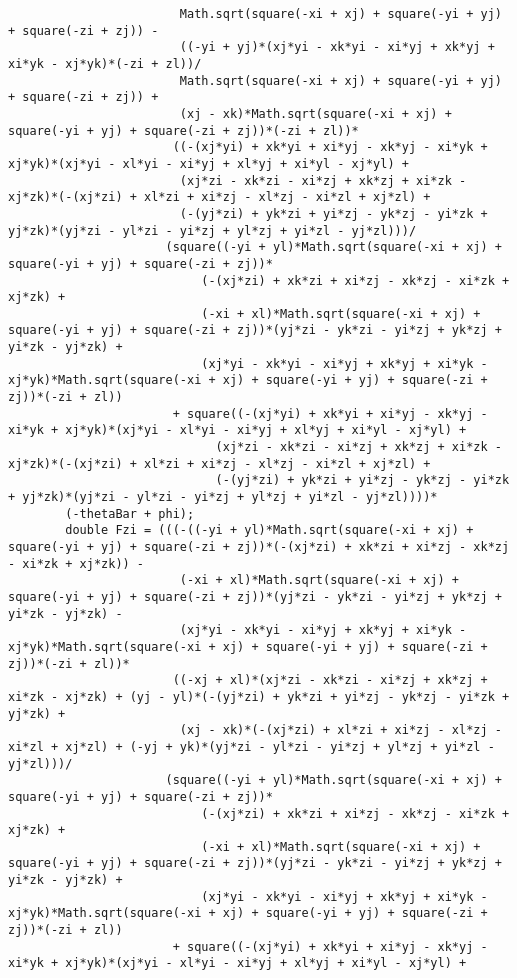 \begin{lstlisting}
						Math.sqrt(square(-xi + xj) + square(-yi + yj) + square(-zi + zj)) - 
						((-yi + yj)*(xj*yi - xk*yi - xi*yj + xk*yj + xi*yk - xj*yk)*(-zi + zl))/
						Math.sqrt(square(-xi + xj) + square(-yi + yj) + square(-zi + zj)) + 
						(xj - xk)*Math.sqrt(square(-xi + xj) + square(-yi + yj) + square(-zi + zj))*(-zi + zl))*
					   ((-(xj*yi) + xk*yi + xi*yj - xk*yj - xi*yk + xj*yk)*(xj*yi - xl*yi - xi*yj + xl*yj + xi*yl - xj*yl) + 
						(xj*zi - xk*zi - xi*zj + xk*zj + xi*zk - xj*zk)*(-(xj*zi) + xl*zi + xi*zj - xl*zj - xi*zl + xj*zl) + 
						(-(yj*zi) + yk*zi + yi*zj - yk*zj - yi*zk + yj*zk)*(yj*zi - yl*zi - yi*zj + yl*zj + yi*zl - yj*zl)))/
					  (square((-yi + yl)*Math.sqrt(square(-xi + xj) + square(-yi + yj) + square(-zi + zj))*
						   (-(xj*zi) + xk*zi + xi*zj - xk*zj - xi*zk + xj*zk) + 
						   (-xi + xl)*Math.sqrt(square(-xi + xj) + square(-yi + yj) + square(-zi + zj))*(yj*zi - yk*zi - yi*zj + yk*zj + yi*zk - yj*zk) + 
						   (xj*yi - xk*yi - xi*yj + xk*yj + xi*yk - xj*yk)*Math.sqrt(square(-xi + xj) + square(-yi + yj) + square(-zi + zj))*(-zi + zl))
					   + square((-(xj*yi) + xk*yi + xi*yj - xk*yj - xi*yk + xj*yk)*(xj*yi - xl*yi - xi*yj + xl*yj + xi*yl - xj*yl) + 
							 (xj*zi - xk*zi - xi*zj + xk*zj + xi*zk - xj*zk)*(-(xj*zi) + xl*zi + xi*zj - xl*zj - xi*zl + xj*zl) + 
							 (-(yj*zi) + yk*zi + yi*zj - yk*zj - yi*zk + yj*zk)*(yj*zi - yl*zi - yi*zj + yl*zj + yi*zl - yj*zl))))*
		(-thetaBar + phi);
		double Fzi = (((-((-yi + yl)*Math.sqrt(square(-xi + xj) + square(-yi + yj) + square(-zi + zj))*(-(xj*zi) + xk*zi + xi*zj - xk*zj - xi*zk + xj*zk)) - 
						(-xi + xl)*Math.sqrt(square(-xi + xj) + square(-yi + yj) + square(-zi + zj))*(yj*zi - yk*zi - yi*zj + yk*zj + yi*zk - yj*zk) - 
						(xj*yi - xk*yi - xi*yj + xk*yj + xi*yk - xj*yk)*Math.sqrt(square(-xi + xj) + square(-yi + yj) + square(-zi + zj))*(-zi + zl))*
					   ((-xj + xl)*(xj*zi - xk*zi - xi*zj + xk*zj + xi*zk - xj*zk) + (yj - yl)*(-(yj*zi) + yk*zi + yi*zj - yk*zj - yi*zk + yj*zk) + 
						(xj - xk)*(-(xj*zi) + xl*zi + xi*zj - xl*zj - xi*zl + xj*zl) + (-yj + yk)*(yj*zi - yl*zi - yi*zj + yl*zj + yi*zl - yj*zl)))/
					  (square((-yi + yl)*Math.sqrt(square(-xi + xj) + square(-yi + yj) + square(-zi + zj))*
						   (-(xj*zi) + xk*zi + xi*zj - xk*zj - xi*zk + xj*zk) + 
						   (-xi + xl)*Math.sqrt(square(-xi + xj) + square(-yi + yj) + square(-zi + zj))*(yj*zi - yk*zi - yi*zj + yk*zj + yi*zk - yj*zk) + 
						   (xj*yi - xk*yi - xi*yj + xk*yj + xi*yk - xj*yk)*Math.sqrt(square(-xi + xj) + square(-yi + yj) + square(-zi + zj))*(-zi + zl))
					   + square((-(xj*yi) + xk*yi + xi*yj - xk*yj - xi*yk + xj*yk)*(xj*yi - xl*yi - xi*yj + xl*yj + xi*yl - xj*yl) + 

\end{lstlisting}
